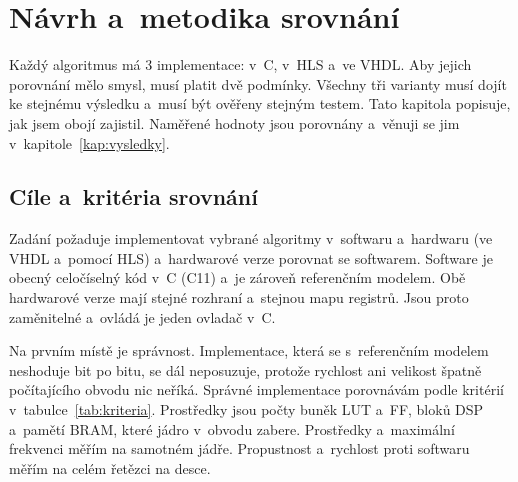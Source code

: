 

\chapter{Návrh a~metodika srovnání}
\label{kap:metodika}

Každý algoritmus má 3 implementace: v~C, v~HLS a~ve VHDL. Aby jejich porovnání mělo smysl, musí platit dvě podmínky. Všechny tři varianty musí dojít ke stejnému výsledku a~musí být ověřeny stejným testem. Tato kapitola popisuje, jak jsem obojí zajistil. Naměřené hodnoty jsou porovnány a~věnuji se jim v~kapitole~\ref{kap:vysledky}.

\section{Cíle a~kritéria srovnání}
\label{sec:kriteria}

Zadání požaduje implementovat vybrané algoritmy v~softwaru a~hardwaru (ve VHDL a~pomocí HLS) a~hardwarové verze porovnat se softwarem. Software je obecný celočíselný kód v~C (C11) a~je zároveň referenčním modelem. Obě hardwarové verze mají stejné rozhraní a~stejnou mapu registrů. Jsou proto zaměnitelné a~ovládá je jeden ovladač v~C.

Na prvním místě je správnost. Implementace, která se s~referenčním modelem neshoduje bit po bitu, se dál neposuzuje, protože rychlost ani velikost špatně počítajícího obvodu nic neříká. Správné implementace porovnávám podle kritérií v~tabulce~\ref{tab:kriteria}. Prostředky jsou počty buněk \acs{LUT} a~\acs{FF}, bloků \acs{DSP} a~pamětí \acs{BRAM}, které jádro v~obvodu zabere. Prostředky a~maximální frekvenci měřím na samotném jádře. Propustnost a~rychlost proti softwaru měřím na celém řetězci na desce.

